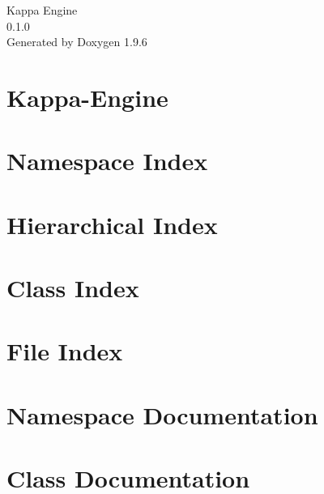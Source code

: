 \documentclass[twoside]{book}
\newcommand{\+}{\discretionary{\mbox{\scriptsize$\hookleftarrow$}}{}{}}
\newcommand{\clearemptydoublepage}{%
    \newpage{\pagestyle{empty}\cleardoublepage}%
  }
\begin{document}
  \raggedbottom
    \hypersetup{pageanchor=false,
                bookmarksnumbered=true,
                pdfencoding=unicode
               }
  \begin{titlepage}
  \vspace*{7cm}
  \begin{center}%
  {\Large Kappa Engine}\\
  [1ex]\large 0.\+1.\+0 \\
  \vspace*{1cm}
  {\large Generated by Doxygen 1.9.6}\\
  \end{center}
  \end{titlepage}
  \clearemptydoublepage
  \tableofcontents
  \clearemptydoublepage
  \hypersetup{pageanchor=true}
\chapter{Kappa-\/\+Engine}
\label{md__r_e_a_d_m_e}

\chapter{Namespace Index}

\chapter{Hierarchical Index}

\chapter{Class Index}

\chapter{File Index}

\chapter{Namespace Documentation}


\chapter{Class Documentation}
















\end{document}
